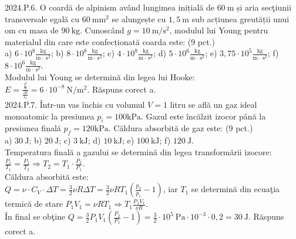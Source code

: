 2024.P.6. O coardă de alpinism având lungimea inițială de $60 \mathrm{~m}$ și aria secţiunii transversale egală cu $60 \mathrm{~mm}^{2}$ se alungește cu $1,5 \mathrm{~m}$ sub acțiunea greutății unui om cu masa de $90 \mathrm{~kg}$. Cunoscând $g=10 \mathrm{~m} / \mathrm{s}^{2}$, modulul lui Young pentru materialul din care este confecționată coarda este: (9 pct.)\\ a) $6 \cdot 10^{8} \frac{\mathrm{kg}}{\mathrm{m} \cdot \mathrm{~s}^{2}}$; b) $8 \cdot 10^{8} \frac{\mathrm{kg}}{\mathrm{m} \cdot \mathrm{~s}^{2}}$; c) $4 \cdot 10^{8} \frac{\mathrm{kg}}{\mathrm{m} \cdot \mathrm{~s}^{2}}$; d) $5 \cdot 10^{6} \frac{\mathrm{kg}}{\mathrm{m} \cdot \mathrm{~s}^{2}}$; e) $3,75 \cdot 10^{5} \frac{\mathrm{kg}}{\mathrm{m} \cdot \mathrm{~s}^{2}}$; f) $8 \cdot 10^{6} \frac{\mathrm{kg}}{\mathrm{m} \cdot \mathrm{~s}^{2}}$.\\ Modulul lui Young se determină din legea lui Hooke:\\ $E=\frac{\frac{F}{S}}{\frac{\Delta l}{l_{0}}}=6 \cdot 10^{-8} \mathrm{~N} / \mathrm{m}^{2}$. Răspuns corect a.\\

2024.P.7. Într-un vas închis cu volumul $V=1$ litru se află un gaz ideal monoatomic la presiunea $p_{i}=100 \mathrm{kPa}$. Gazul este încălzit izocor până la presiunea finală $p_{f}=120 \mathrm{kPa}$. Căldura absorbită de gaz este: (9 pct.)\\ a) $30 \mathrm{~J}$; b) $20 \mathrm{~J}$; c) $3 \mathrm{~kJ}$; d) $10 \mathrm{~kJ}$; e) $100 \mathrm{~kJ}$; f) $120 \mathrm{~J}$.\\ Temperatura finală a gazului se determină din legea transformării izocore:\\ $\frac{P_{1}}{T_{1}}=\frac{P_{2}}{T_{2}} \Rightarrow T_{2}=T_{1} \cdot \frac{P_{2}}{P_{1}}$.\\ Căldura absorbită este:\\ $Q=\nu \cdot C_{V} \cdot \Delta T=\frac{3}{2} \nu R \Delta T=\frac{3}{2} \nu R T_{1}\left(\frac{p_{2}}{p_{1}}-1\right)$, iar $T_{1}$ se determină din ecuaţia termică de stare $P_{1} V_{1}=\nu R T_{1} \Rightarrow T_{1} \frac{P_{1} V_{1}}{\nu R}$.\\ În final se obţine $Q=\frac{3}{2} P_{1} V_{1}\left(\frac{P_{2}}{P_{1}}-1\right)=\frac{3}{2} \cdot 10^{5} \mathrm{~Pa} \cdot 10^{-3} \cdot 0,2=30 \mathrm{~J}$. Răspuns corect a.\\

